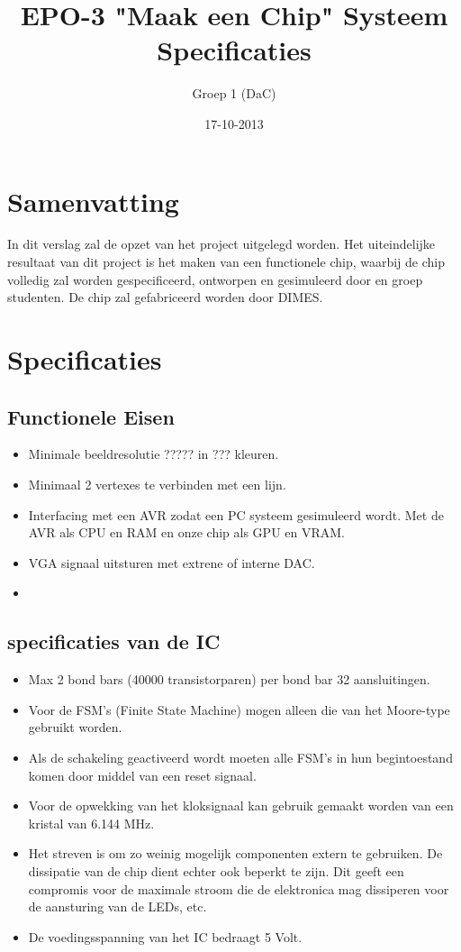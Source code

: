 \documentclass{scrartcl}
\author{Groep 1 (DaC)}
\title{EPO-3 "Maak een Chip" Systeem Specificaties}
\date{17-10-2013}
\begin{document}
\maketitle
\vspace{80 mm}
\section*{Samenvatting}
In dit verslag zal de opzet van het project uitgelegd worden. Het uiteindelijke resultaat van dit project is het maken van een functionele chip, waarbij de chip volledig zal worden gespecificeerd, ontworpen en gesimuleerd door en groep studenten. De chip zal gefabriceerd worden door DIMES. 
\newpage
\setlength{\cftbeforetoctitleskip}{-3em}

\tableofcontents
\newpage
{}
\section{Specificaties}
\subsection {Functionele Eisen}
\begin {itemize}
\item Minimale beeldresolutie ?????  in ???  kleuren.
\item Minimaal 2 vertexes te verbinden met een lijn.
\item Interfacing met een AVR zodat een PC systeem gesimuleerd wordt. Met de AVR als CPU en RAM en onze chip als GPU en VRAM.
\item VGA signaal uitsturen met extrene of interne DAC.
\item 
\end{itemize}


\subsection {specificaties van de IC}
\begin {itemize}
\item Max 2 bond bars (40000 transistorparen) per bond bar 32 aansluitingen.
\item Voor de FSM’s (Finite State Machine) mogen alleen die van het Moore-type gebruikt worden.
\item Als de schakeling geactiveerd wordt moeten alle FSM’s in hun begintoestand komen door middel van een reset signaal.
\item Voor de opwekking van het kloksignaal kan gebruik gemaakt worden van een kristal van 6.144 MHz.
\item Het streven is om zo weinig mogelijk componenten extern te gebruiken. De dissipatie van de
chip dient echter ook beperkt te zijn. Dit geeft een compromis voor de maximale stroom die de elektronica mag dissiperen voor de aansturing van de LEDs, etc.
\item De voedingsspanning van het IC bedraagt 5 Volt.

\end{itemize}
\end{document}
